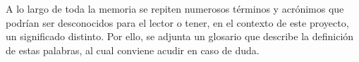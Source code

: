 A lo largo de toda la memoria se repiten numerosos términos y acrónimos que podrían
ser desconocidos para el lector o tener, en el contexto de este proyecto, un significado distinto. Por ello, se adjunta un glosario que describe la definición de estas palabras, al cual conviene acudir en caso de duda.







































